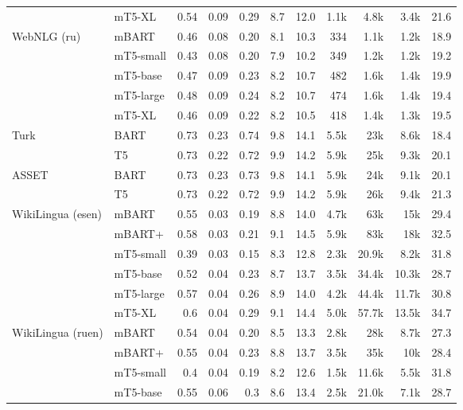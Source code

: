 \documentclass[11pt,a4paper]{article}
\begin{document}
\begin{table*}[!htbp]
\begin{tabular}{@{}llrrrrrrrrr@{}}
 & \small{mT5-XL} & 0.54 & 0.09 & 0.29 & 8.7 & 12.0 & 1.1k & 4.8k & 3.4k & 21.6 \\
\small{WebNLG (ru)} & \small{mBART} & 0.46 & 0.08 & 0.20 & 8.1 & 10.3 & 334 & 1.1k & 1.2k & 18.9 \\
 & \small{mT5-small} & 0.43 & 0.08 & 0.20 & 7.9 & 10.2 & 349 & 1.2k & 1.2k & 19.2 \\
 & \small{mT5-base} & 0.47 & 0.09 & 0.23 & 8.2 & 10.7 & 482 & 1.6k & 1.4k & 19.9 \\
 & \small{mT5-large} & 0.48 & 0.09 & 0.24 & 8.2 & 10.7 & 474 & 1.6k & 1.4k & 19.4 \\
 & \small{mT5-XL} & 0.46 & 0.09 & 0.22 & 8.2 & 10.5 & 418 & 1.4k & 1.3k & 19.5 \\
 \midrule
\multirow{2}{*}{Turk} & \small{BART} & 0.73 & 0.23 & 0.74 & 9.8 & 14.1 & 5.5k & 23k & 8.6k & 18.4 \\
 & \small{T5} & 0.73 & 0.22 & 0.72 & 9.9 & 14.2 & 5.9k & 25k  & 9.3k & 20.1 \\
\midrule
\multirow{2}{*}{ASSET} & \small{BART} & 0.73 & 0.23 & 0.73 & 9.8 & 14.1 & 5.9k & 24k & 9.1k & 20.1 \\
 & \small{T5} & 0.73 & 0.22 & 0.72 & 9.9 & 14.2 & 5.9k & 26k & 9.4k & 21.3 \\
\midrule
\multirow{2}{*}{WikiLingua (esen)} & \small{mBART} & 0.55 & 0.03 & 0.19 & 8.8 & 14.0 & 4.7k & 63k & 15k & 29.4 \\
 & \small{mBART+} & 0.58 & 0.03 & 0.21 & 9.1 & 14.5 & 5.9k & 83k & 18k & 32.5 \\
  & \small{mT5-small} & 0.39 & 0.03 & 0.15 & 8.3 & 12.8 & 2.3k & 20.9k & 8.2k & 31.8 \\
 & \small{mT5-base} & 0.52 & 0.04 & 0.23 & 8.7 & 13.7 & 3.5k & 34.4k & 10.3k & 28.7 \\
 & \small{mT5-large} & 0.57 & 0.04 & 0.26 & 8.9 & 14.0 & 4.2k & 44.4k & 11.7k & 30.8 \\
 & \small{mT5-XL} & 0.6 & 0.04 & 0.29 & 9.1 & 14.4 & 5.0k & 57.7k & 13.5k & 34.7 \\
\multirow{2}{*}{WikiLingua (ruen)} & \small{mBART} & 0.54 & 0.04 & 0.20 & 8.5 & 13.3 & 2.8k & 28k & 8.7k & 27.3 \\
 & \small{mBART+} & 0.55 & 0.04 & 0.23 & 8.8 & 13.7 & 3.5k & 35k & 10k & 28.4  \\
  & \small{mT5-small} & 0.4 & 0.04 & 0.19 & 8.2 & 12.6 & 1.5k & 11.6k & 5.5k & 31.8 \\
 & \small{mT5-base} & 0.55 & 0.06 & 0.3 & 8.6 & 13.4 & 2.5k & 21.0k & 7.1k & 28.7 \\

\end{tabular}
\end{table*}
\end{document}
